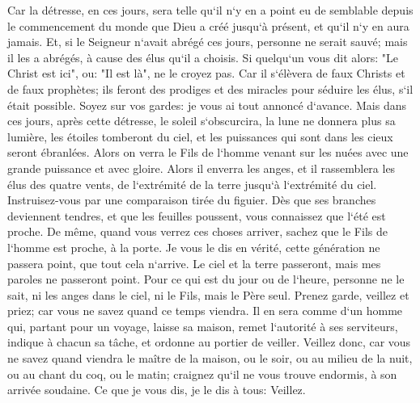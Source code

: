 \verse Car la détresse, en ces jours, sera telle qu`il n`y en a point eu de semblable depuis le commencement du monde que Dieu a créé jusqu`à présent, et qu`il n`y en aura jamais. 
\verse Et, si le Seigneur n`avait abrégé ces jours, personne ne serait sauvé; mais il les a abrégés, à cause des élus qu`il a choisis. 
\verse Si quelqu`un vous dit alors: "Le Christ est ici", ou: "Il est là", ne le croyez pas. 
\verse Car il s`élèvera de faux Christs et de faux prophètes; ils feront des prodiges et des miracles pour séduire les élus, s`il était possible. 
\verse Soyez sur vos gardes: je vous ai tout annoncé d`avance. 
\verse Mais dans ces jours, après cette détresse, le soleil s`obscurcira, la lune ne donnera plus sa lumière, 
\verse les étoiles tomberont du ciel, et les puissances qui sont dans les cieux seront ébranlées. 
\verse Alors on verra le Fils de l`homme venant sur les nuées avec une grande puissance et avec gloire. 
\verse Alors il enverra les anges, et il rassemblera les élus des quatre vents, de l`extrémité de la terre jusqu`à l`extrémité du ciel. 
\verse Instruisez-vous par une comparaison tirée du figuier. Dès que ses branches deviennent tendres, et que les feuilles poussent, vous connaissez que l`été est proche. 
\verse De même, quand vous verrez ces choses arriver, sachez que le Fils de l`homme est proche, à la porte. 
\verse Je vous le dis en vérité, cette génération ne passera point, que tout cela n`arrive. 
\verse Le ciel et la terre passeront, mais mes paroles ne passeront point. 
\verse Pour ce qui est du jour ou de l`heure, personne ne le sait, ni les anges dans le ciel, ni le Fils, mais le Père seul. 
\verse Prenez garde, veillez et priez; car vous ne savez quand ce temps viendra. 
\verse Il en sera comme d`un homme qui, partant pour un voyage, laisse sa maison, remet l`autorité à ses serviteurs, indique à chacun sa tâche, et ordonne au portier de veiller. 
\verse Veillez donc, car vous ne savez quand viendra le maître de la maison, ou le soir, ou au milieu de la nuit, ou au chant du coq, ou le matin; 
\verse craignez qu`il ne vous trouve endormis, à son arrivée soudaine. 
\verse Ce que je vous dis, je le dis à tous: Veillez. 

\chapter{}

